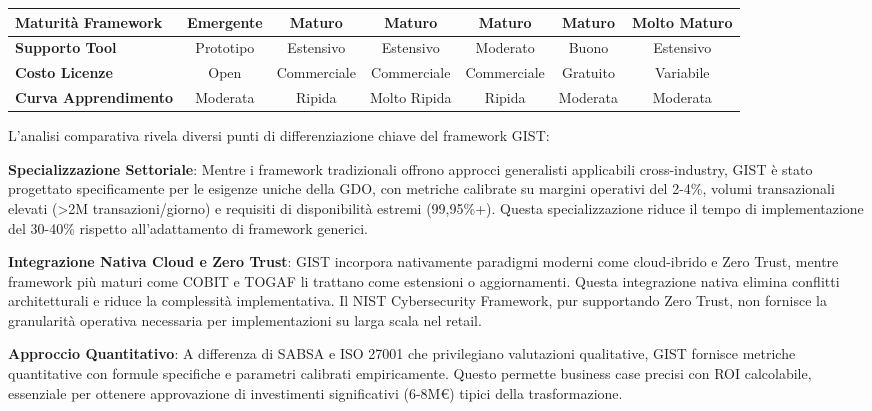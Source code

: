 \begin{table}[htbp]
{\begin{tabular}{l c c c c c c}
        \midrule
        \rowcolor{gray!5}
        \textbf{Maturità Framework} & Emergente & \cellcolor{green!20}Maturo & \cellcolor{green!20}Maturo & Maturo & Maturo & \cellcolor{green!20}Molto Maturo \\
        \midrule
        \textbf{Supporto Tool} & Prototipo & \cellcolor{green!20}Estensivo & \cellcolor{green!20}Estensivo & Moderato & Buono & \cellcolor{green!20}Estensivo \\
        \midrule
        \rowcolor{gray!5}
        \textbf{Costo Licenze} & \cellcolor{green!20}Open & Commerciale & Commerciale & Commerciale & \cellcolor{green!20}Gratuito & Variabile \\
        \midrule
        \textbf{Curva Apprendimento} & \cellcolor{green!20}Moderata & Ripida & Molto Ripida & Ripida & Moderata & Moderata \\
        \bottomrule
    \end{tabular}
    }
\end{table}

L'analisi comparativa rivela diversi punti di differenziazione chiave del framework GIST:

\textbf{Specializzazione Settoriale}: Mentre i framework tradizionali offrono approcci generalisti applicabili cross-industry, GIST è stato progettato specificamente per le esigenze uniche della GDO, con metriche calibrate su margini operativi del 2-4\%, volumi transazionali elevati (>2M transazioni/giorno) e requisiti di disponibilità estremi (99,95\%+). Questa specializzazione riduce il tempo di implementazione del 30-40\% rispetto all'adattamento di framework generici.

\textbf{Integrazione Nativa Cloud e Zero Trust}: GIST incorpora nativamente paradigmi moderni come cloud-ibrido e Zero Trust, mentre framework più maturi come COBIT e TOGAF li trattano come estensioni o aggiornamenti. Questa integrazione nativa elimina conflitti architetturali e riduce la complessità implementativa. Il NIST Cybersecurity Framework, pur supportando Zero Trust, non fornisce la granularità operativa necessaria per implementazioni su larga scala nel retail.

\textbf{Approccio Quantitativo}: A differenza di SABSA e ISO 27001 che privilegiano valutazioni qualitative, GIST fornisce metriche quantitative con formule specifiche e parametri calibrati empiricamente. Questo permette business case precisi con ROI calcolabile, essenziale per ottenere approvazione di investimenti significativi (6-8M€) tipici della trasformazione.

